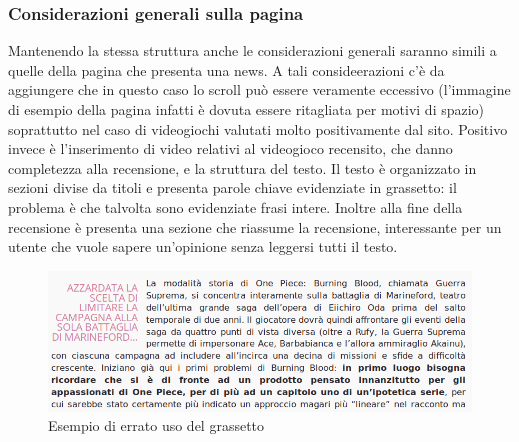 \documentclass[../ProgettoTecWeb2.tex]{subfiles}
\begin{document}
		\subsubsection{Considerazioni generali sulla pagina}
		Mantenendo la stessa struttura anche le considerazioni generali saranno simili a quelle della pagina che presenta una news. A tali consideerazioni c'è da aggiungere che in questo caso lo scroll può essere veramente eccessivo (l'immagine di esempio della pagina infatti è dovuta essere ritagliata per motivi di spazio) soprattutto nel caso di videogiochi valutati molto positivamente dal sito. Positivo invece è l'inserimento di video relativi al videogioco recensito, che danno completezza alla recensione, e la struttura del testo. Il testo è organizzato in sezioni divise da titoli e presenta parole chiave evidenziate in grassetto: il problema è che talvolta sono evidenziate frasi intere. Inoltre alla fine della recensione è presenta una sezione che riassume la recensione, interessante per un utente che vuole sapere un'opinione senza leggersi tutti il testo.
		\begin{figure} [H]
			\centering
			\includegraphics[scale=0.4]{img/ErratoUsoGrassetto}
			\caption{Esempio di errato uso del grassetto}
		\end{figure}

	\newpage
\end{document}

